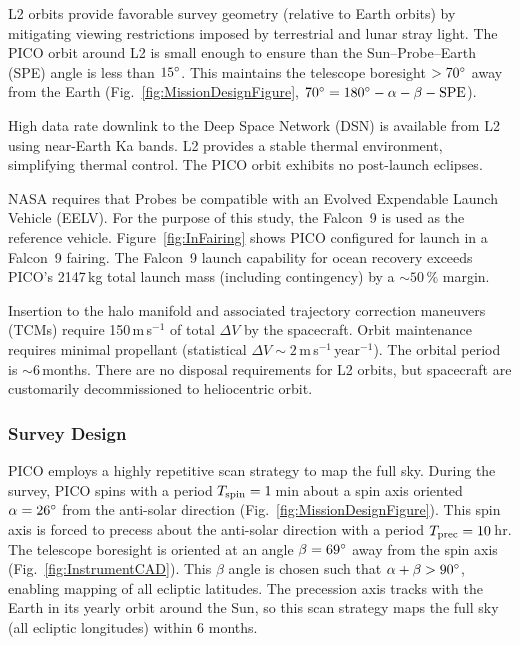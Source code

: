 L2 orbits provide favorable survey geometry (relative to Earth orbits)
by mitigating viewing restrictions imposed by terrestrial and lunar
stray light. The PICO orbit around L2 is small enough to ensure than
the Sun--Probe--Earth (SPE) angle is less than $15^\circ$. This
maintains the telescope boresight $>70^\circ$ away from the Earth
(Fig.~\ref{fig:MissionDesignFigure},
$70^\circ = 180^\circ -\alpha - \beta - \rm{SPE}$).

%

High data rate downlink to the Deep Space Network (DSN) is available
from L2 using near-Earth Ka bands. L2 provides a stable thermal
environment, simplifying thermal control. The PICO orbit exhibits no
post-launch eclipses.
 
NASA requires that Probes be compatible with an Evolved Expendable
Launch Vehicle (EELV). For the purpose of this study, the Falcon~9
\citep{SpaceX2015} is used as the reference
vehicle. Figure~\ref{fig:InFairing} shows PICO configured for launch
in a Falcon~9 fairing. The Falcon~9 launch capability for ocean
recovery exceeds PICO's 2147\,kg total launch mass (including contingency) by a
$\sim 50\,\%$ margin.

Insertion to the halo manifold and associated trajectory correction
maneuvers (TCMs) require 150\,m\,s$^{-1}$ of total $\Delta V$ by the
spacecraft. Orbit maintenance requires minimal propellant (statistical
$\Delta V\sim 2$\,m\,s$^{-1}$\,year$^{-1}$). The orbital period is $\sim6$\,months.
There are no disposal requirements for L2 orbits, but spacecraft are customarily
decommissioned to heliocentric orbit.


\subsubsection{Survey Design}
\label{sec:survey_design} %
 
PICO employs a highly repetitive scan strategy to map the full
sky. During the survey, PICO spins with a period
$T_{\rm spin} = 1$\,min about a spin axis oriented $\alpha=26^\circ$
from the anti-solar direction (Fig.~\ref{fig:MissionDesignFigure}). This spin axis
is forced to precess about the anti-solar direction with a period
$T_{\rm prec}= 10$\,hr. The telescope boresight is oriented at an
angle $\beta=69^\circ$ away from the spin axis (Fig.~\ref{fig:InstrumentCAD}). This $\beta$ angle is
chosen such that $\alpha + \beta > 90^\circ$, enabling mapping of all
ecliptic latitudes. The precession axis tracks with the Earth in its
yearly orbit around the Sun, so this scan strategy maps the full sky
(all ecliptic longitudes) within 6 months.


